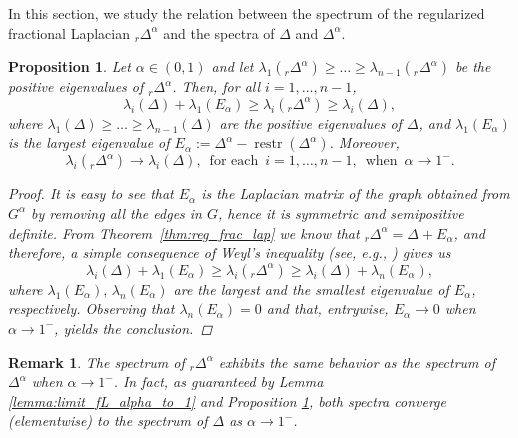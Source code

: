 \documentclass[a4paper,12pt]{article}
\newtheorem{remark}{Remark}
\newtheorem{proposition}{Proposition}
\DeclareMathOperator{\restr}{restr}
\newcommand{\fL}{\Delta^\alpha}
\newcommand{\rfL}{{}_r\fL}
\begin{document}
In this section, we study the relation between the spectrum of the regularized fractional Laplacian $\rfL$ and the spectra of $\Delta$ and $\fL$. 

\begin{proposition} \label{prop:shift_eigenvalue_L}
Let $\alpha\in(0,1)$ and let $\lambda_1(\rfL)\geq \dots \geq\lambda_{n-1}(\rfL)$ be the positive eigenvalues of $\rfL$. Then, for all $i=1,\dots,n-1$,
\begin{equation*} \label{eq:eigs_reg_frac_lap}
  \lambda_i(\Delta) + \lambda_1(E_{\alpha}) \geq \lambda_i(\rfL) \geq \lambda_i(\Delta),   
\end{equation*}
where $\lambda_1(\Delta)\geq\dots\geq \lambda_{n-1}(\Delta)$ are the positive eigenvalues of $\Delta$, and $\lambda_1(E_{\alpha})$ is the largest eigenvalue of $E_{\alpha}:=\fL - \restr(\fL)$. Moreover,
\begin{equation*} \label{eq:eigs_frac_lap_limits}
    \lambda_i(\rfL) \rightarrow \lambda_i(\Delta), \, \text{ for each }\, i=1,\dots,n-1, \, \text{ when } \,\alpha\rightarrow1^-.
\end{equation*}
\begin{proof}
It is easy to see that $E_{\alpha}$ is the Laplacian matrix of the graph obtained from $G^{\alpha}$ by removing all the edges in $G$, hence it is symmetric and semipositive definite. From Theorem~\ref{thm:reg_frac_lap} we know that $\rfL=\Delta + E_{\alpha}$, and therefore, a simple consequence of Weyl's inequality (see, e.g., \cite[Example 7.5.2]{meyer2000matrix}) gives us
\begin{equation*}
  \lambda_i(\Delta) + \lambda_1(E_{\alpha}) \geq \lambda_i(\rfL) \geq \lambda_i(\Delta) + \lambda_n(E_{\alpha}),    
\end{equation*}
where $\lambda_1(E_{\alpha}),\, \lambda_n(E_{\alpha})$ are the largest and the smallest eigenvalue of $E_{\alpha}$, respectively. Observing that $\lambda_n(E_{\alpha})=0$ and that, entrywise, $E_{\alpha}\rightarrow 0$ when $\alpha\rightarrow1^-$, yields the conclusion. 
\end{proof}
\end{proposition}
%

\begin{remark}
The spectrum of $\rfL$ exhibits the same behavior as the spectrum of $\fL$ when $\alpha\rightarrow1^-$. In fact, as guaranteed by Lemma \ref{lemma:limit_fL_alpha_to_1} and Proposition \ref{prop:shift_eigenvalue_L}, both spectra converge (elementwise) to the spectrum of $\Delta$ as $\alpha\rightarrow1^-$.     
\end{remark}
\end{document}
